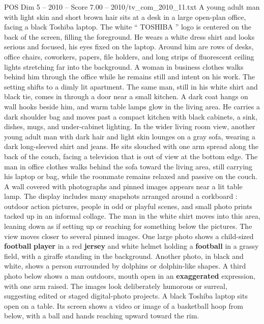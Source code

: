 \begin{textsample}{POS Dim 5 – 2010 – Score 7.00 – 2010/tv\_com\_2010\_11.txt}  \label{ex:f5_pos_049}
A young adult man with light skin and short brown hair sits at a desk in a large open-plan office, facing a black Toshiba laptop.
The white “ TOSHIBA ” logo is centered on the back of the screen, filling the foreground.
He wears a white dress shirt and looks serious and focused, his eyes fixed on the laptop.
Around him are rows of desks, office chairs, coworkers, papers, file holders, and long strips of fluorescent ceiling lights stretching far into the background.
A woman in business clothes walks behind him through the office while he remains still and intent on his work.
The setting shifts to a dimly lit apartment.
The same man, still in his white shirt and black tie, comes in through a door near a small kitchen.
A dark coat hangs on wall hooks beside him, and warm table lamps glow in the living area.
He carries a dark shoulder bag and moves past a compact kitchen with black cabinets, a sink, dishes, mugs, and under-cabinet lighting.
In the wider living room view, another young adult man with dark hair and light skin lounges on a gray sofa, wearing a dark long-sleeved shirt and jeans.
He sits slouched with one arm spread along the back of the couch, facing a television that is out of view at the bottom edge.
The man in office clothes walks behind the sofa toward the living area, still carrying his laptop or bag, while the roommate remains relaxed and passive on the couch.
A wall covered with photographs and pinned images appears near a lit table lamp.
The display includes many snapshots arranged around a corkboard : outdoor action pictures, people in odd or playful scenes, and small photo prints tacked up in an informal collage.
The man in the white shirt moves into this area, leaning down as if setting up or reaching for something below the pictures.
The view moves closer to several pinned images.
One large photo shows a child-sized \textbf{football} \textbf{player} in a red \textbf{jersey} and white helmet holding a \textbf{football} in a grassy field, with a giraffe standing in the background.
Another photo, in black and white, shows a person surrounded by dolphins or dolphin-like shapes.
A third photo below shows a man outdoors, mouth open in an \textbf{exaggerated} expression, with one arm raised.
The images look deliberately humorous or surreal, suggesting edited or staged digital-photo projects.
A black Toshiba laptop sits open on a table.
Its screen shows a video or image of a basketball hoop from below, with a ball and hands reaching upward toward the rim.

\end{textsample}
